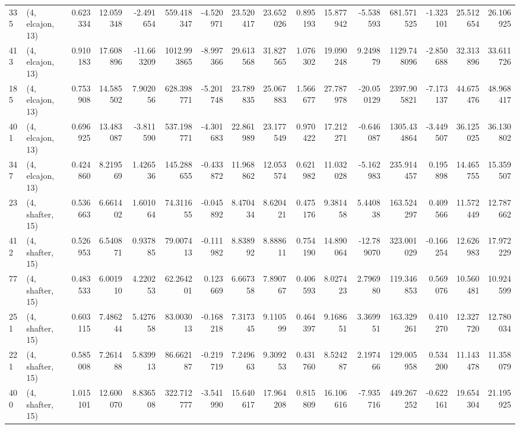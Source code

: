 \begin{tabular}{llrrrrrrrrrrrrrr}
335 &  (4, elcajon, 13) &   0.623334 &  12.059348 &  -2.491654 &   559.418347 &  -4.520971 &  23.520417 &  23.652026 &  0.895193 &  15.877942 &  -5.538593 &   681.571525 &  -1.323101 &  25.512654 &  26.106925 \\
413 &  (4, elcajon, 13) &   0.910183 &  17.608896 & -11.663209 &  1012.993865 &  -8.997366 &  29.613568 &  31.827565 &  1.076302 &  19.090248 &   9.249879 &  1129.748096 &  -2.850688 &  32.313896 &  33.611726 \\
185 &  (4, elcajon, 13) &   0.753908 &  14.585502 &   7.902056 &   628.398771 &  -5.201748 &  23.789835 &  25.067883 &  1.566677 &  27.787978 & -20.050129 &  2397.905821 &  -7.173137 &  44.675476 &  48.968417 \\
401 &  (4, elcajon, 13) &   0.696925 &  13.483087 &  -3.811590 &   537.198771 &  -4.301683 &  22.861989 &  23.177549 &  0.970422 &  17.212271 &  -0.646087 &  1305.434864 &  -3.449507 &  36.125025 &  36.130802 \\
347 &  (4, elcajon, 13) &   0.424860 &   8.219569 &   1.426536 &   145.288655 &  -0.433872 &  11.968862 &  12.053574 &  0.621982 &  11.032028 &  -5.162983 &   235.914457 &   0.195898 &  14.465755 &  15.359507 \\
23  &  (4, shafter, 15) &   0.536663 &   6.661402 &   1.601064 &    74.311655 &  -0.045892 &   8.470434 &   8.620421 &  0.475176 &   9.381458 &   5.440838 &   163.524297 &   0.409566 &  11.572449 &  12.787662 \\
412 &  (4, shafter, 15) &   0.526953 &   6.540871 &   0.937885 &    79.007413 &  -0.111982 &   8.838992 &   8.888611 &  0.754190 &  14.890064 & -12.789070 &   323.001029 &  -0.166254 &  12.626983 &  17.972229 \\
77  &  (4, shafter, 15) &   0.483533 &   6.001910 &   4.220253 &    62.264201 &   0.123669 &   6.667358 &   7.890767 &  0.406593 &   8.027423 &   2.796980 &   119.346853 &   0.569076 &  10.560481 &  10.924599 \\
251 &  (4, shafter, 15) &   0.603115 &   7.486244 &   5.427658 &    83.003013 &  -0.168218 &   7.317345 &   9.110599 &  0.464397 &   9.168651 &   3.369951 &   163.329261 &   0.410270 &  12.327720 &  12.780034 \\
221 &  (4, shafter, 15) &   0.585008 &   7.261488 &   5.839913 &    86.662187 &  -0.219719 &   7.249663 &   9.309253 &  0.431760 &   8.524287 &   2.197466 &   129.005958 &   0.534200 &  11.143478 &  11.358079 \\
400 &  (4, shafter, 15) &   1.015101 &  12.600070 &   8.836508 &   322.712777 &  -3.541990 &  15.640617 &  17.964208 &  0.815809 &  16.106616 &  -7.935716 &   449.267252 &  -0.622161 &  19.654304 &  21.195925 \\

\end{tabular}
